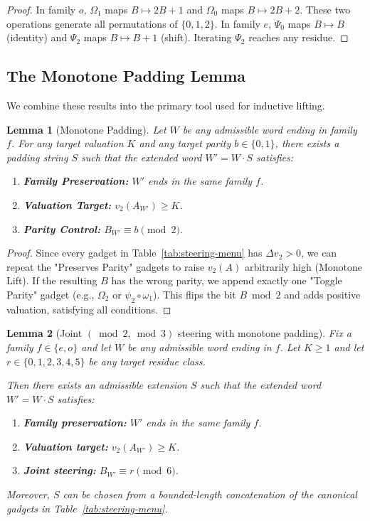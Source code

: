 \documentclass[11pt,letterpaper]{amsart}
\def\mathrm#1{#1}%
\theoremstyle{definition}
\theoremstyle{plain}
\newtheorem{lemma}{Lemma}
\theoremstyle{plain}
\theoremstyle{remark}
\begin{document}
\begin{proof}
In family $\mathrm{o}$, $\Omega_1$ maps $B \mapsto 2B+1$ and $\Omega_0$ maps $B \mapsto 2B+2$. These two operations generate all permutations of $\{0,1,2\}$.
In family $\mathrm{e}$, $\Psi_0$ maps $B \mapsto B$ (identity) and $\Psi_2$ maps $B \mapsto B+1$ (shift). Iterating $\Psi_2$ reaches any residue.
\end{proof}

\subsection{The Monotone Padding Lemma}
We combine these results into the primary tool used for inductive lifting.

\begin{lemma}[Monotone Padding]
\label{lem:monotone-padding}
Let $W$ be any admissible word ending in family $f$. For any target valuation $K$ and any target parity $b \in \{0, 1\}$, there exists a padding string $S$ such that the extended word $W' = W \cdot S$ satisfies:
\begin{enumerate}
    \item \textbf{Family Preservation:} $W'$ ends in the same family $f$.
    \item \textbf{Valuation Target:} $v_2(A_{W'}) \ge K$.
    \item \textbf{Parity Control:} $B_{W'} \equiv b \pmod 2$.
\end{enumerate}
\end{lemma}

\begin{proof}
Since every gadget in Table~\ref{tab:steering-menu} has $\Delta v_2 > 0$, we can repeat the "Preserves Parity" gadgets to raise $v_2(A)$ arbitrarily high (Monotone Lift).
If the resulting $B$ has the wrong parity, we append exactly one "Toggle Parity" gadget (e.g., $\Omega_2$ or $\psi_2 \circ \omega_1$). This flips the bit $B \bmod 2$ and adds positive valuation, satisfying all conditions.
\end{proof}

\begin{lemma}[Joint $(\bmod 2,\bmod 3)$ steering with monotone padding]
\label{lem:joint-mod6-steering}
Fix a family $f\in\{\mathrm e,\mathrm o\}$ and let $W$ be any admissible word ending in $f$.
Let $K\ge 1$ and let $r\in\{0,1,2,3,4,5\}$ be any target residue class.

Then there exists an admissible extension $S$ such that the extended word
$W' = W\cdot S$ satisfies:
\begin{enumerate}
\item \textbf{Family preservation:} $W'$ ends in the same family $f$.
\item \textbf{Valuation target:} $v_2(A_{W'}) \ge K$.
\item \textbf{Joint steering:} $B_{W'} \equiv r \pmod 6$.
\end{enumerate}
Moreover, $S$ can be chosen from a bounded-length concatenation of the canonical gadgets
in Table~\ref{tab:steering-menu}.
\end{lemma}
\end{document}
